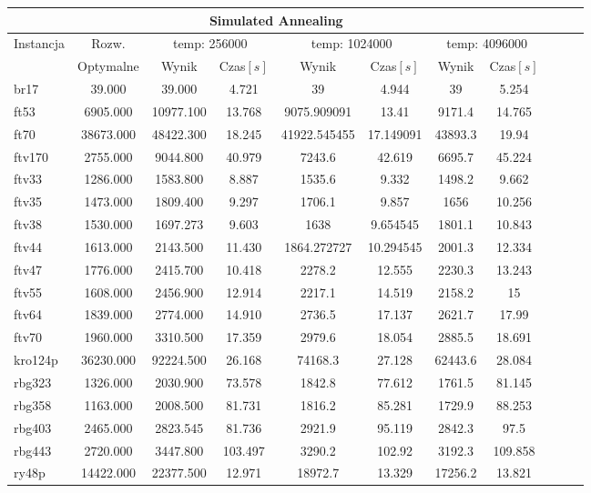 \begin{center}

\begin{tabular}{lcccccccccc}

\toprule
\multicolumn{8}{c}{Simulated Annealing} \\
\midrule
\multirow{2}{*}{Instancja} & {Rozw.} &
\multicolumn{2}{c}{temp: 256000} & \multicolumn{2}{c}{temp: 1024000} & 
\multicolumn{2}{c}{temp: 4096000}
 \\
 & Optymalne & Wynik & Czas$[s]$ & Wynik & Czas$[s]$ & Wynik & Czas$[s]$ 
  \\
\toprule
br17 & 39.000 & 39.000 & 4.721 & 39 & 4.944 & 39 & 5.254 \\
\midrule
ft53 & 6905.000 & 10977.100 & 13.768 & 9075.909091 & 13.41 & 9171.4 & 14.765 \\
\midrule
ft70 & 38673.000 & 48422.300 & 18.245 & 41922.545455 & 17.149091 & 43893.3 & 19.94 \\
\midrule
ftv170 & 2755.000 & 9044.800 & 40.979 & 7243.6 & 42.619 & 6695.7 & 45.224 \\
\midrule
ftv33 & 1286.000 & 1583.800 & 8.887 & 1535.6 & 9.332 & 1498.2 & 9.662 \\
\midrule
ftv35 & 1473.000 & 1809.400 & 9.297 & 1706.1 & 9.857 & 1656 & 10.256 \\
\midrule
ftv38 & 1530.000 & 1697.273 & 9.603 & 1638 & 9.654545 & 1801.1 & 10.843 \\
\midrule
ftv44 & 1613.000 & 2143.500 & 11.430 & 1864.272727 & 10.294545 & 2001.3 & 12.334 \\
\midrule
ftv47 & 1776.000 & 2415.700 & 10.418 & 2278.2 & 12.555 & 2230.3 & 13.243 \\
\midrule
ftv55 & 1608.000 & 2456.900 & 12.914 & 2217.1 & 14.519 & 2158.2 & 15 \\
\midrule
ftv64 & 1839.000 & 2774.000 & 14.910 & 2736.5 & 17.137 & 2621.7 & 17.99 \\
\midrule
ftv70 & 1960.000 & 3310.500 & 17.359 & 2979.6 & 18.054 & 2885.5 & 18.691 \\
\midrule
kro124p & 36230.000 & 92224.500 & 26.168 & 74168.3 & 27.128 & 62443.6 & 28.084 \\
\midrule
rbg323 & 1326.000 & 2030.900 & 73.578 & 1842.8 & 77.612 & 1761.5 & 81.145 \\
\midrule
rbg358 & 1163.000 & 2008.500 & 81.731 & 1816.2 & 85.281 & 1729.9 & 88.253 \\
\midrule
rbg403 & 2465.000 & 2823.545 & 81.736 & 2921.9 & 95.119 & 2842.3 & 97.5 \\
\midrule
rbg443 & 2720.000 & 3447.800 & 103.497 & 3290.2 & 102.92 & 3192.3 & 109.858 \\
\midrule
ry48p & 14422.000 & 22377.500 & 12.971 & 18972.7 & 13.329 & 17256.2 & 13.821 \\
\bottomrule
\end{tabular}
\end{center}


